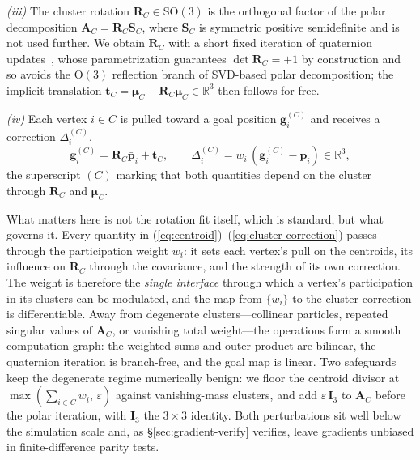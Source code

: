 \emph{(iii)} The cluster rotation $\mathbf{R}_C\in\mathrm{SO}(3)$ is the
orthogonal factor of the polar decomposition
$\mathbf{A}_C=\mathbf{R}_C\mathbf{S}_C$, where $\mathbf{S}_C$ is
symmetric positive semidefinite and is not used further. We obtain
$\mathbf{R}_C$ with a short fixed iteration of quaternion
updates~\cite{muller2016}, whose parametrization guarantees
$\det\mathbf{R}_C=+1$ by construction and so avoids the $\mathrm{O}(3)$
reflection branch of SVD-based polar decomposition; the implicit
translation $\mathbf{t}_C=\boldsymbol{\mu}_C-\mathbf{R}_C
\bar{\boldsymbol{\mu}}_C\in\mathbb{R}^3$ then follows for free.

\emph{(iv)} Each vertex $i\in C$ is pulled toward a goal position
$\mathbf{g}_i^{(C)}$ and receives a correction $\Delta_i^{(C)}$,
\begin{equation}
  \mathbf{g}_i^{(C)} = \mathbf{R}_C \bar{\mathbf{p}}_i + \mathbf{t}_C,
  \qquad
  \Delta_i^{(C)} = w_i\,(\mathbf{g}_i^{(C)} - \mathbf{p}_i)
            \in \mathbb{R}^3,
  \label{eq:cluster-correction}
\end{equation}
the superscript $(C)$ marking that both quantities depend on the
cluster through $\mathbf{R}_C$ and $\boldsymbol{\mu}_C$.
 
What matters here is not the rotation fit itself, which is standard,
but what governs it. Every quantity in
(\ref{eq:centroid})--(\ref{eq:cluster-correction}) passes through the
participation weight $w_i$: it sets each vertex's pull on the
centroids, its influence on $\mathbf{R}_C$ through the covariance, and
the strength of its own correction. The weight is therefore the \emph{single
interface} through which a vertex's participation in its clusters can
be modulated, and the map from $\{w_i\}$ to the cluster correction is
differentiable. Away from degenerate clusters---collinear particles,
repeated singular values of $\mathbf{A}_C$, or vanishing total
weight---the operations form a smooth computation graph: the weighted
sums and outer product are bilinear, the quaternion iteration is
branch-free, and the goal map is linear. Two safeguards keep the
degenerate regime numerically benign: we floor the centroid divisor at
$\max(\sum_{i\in C} w_i,\,\varepsilon)$ against vanishing-mass clusters,
and add $\varepsilon\,\mathbf{I}_3$ to $\mathbf{A}_C$ before the polar
iteration, with $\mathbf{I}_3$ the $3\!\times\!3$ identity. Both
perturbations sit well below the simulation scale and, as
\S\ref{sec:gradient-verify} verifies, leave gradients unbiased in
finite-difference parity tests.
 
